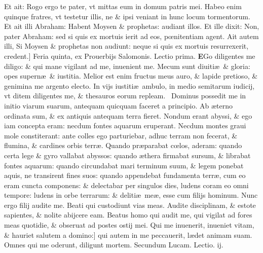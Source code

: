 \documentclass[a5paper,10pt]{book}
\def\leftmarginnote{%
	\lrmarginnote{\hskip -\marginparsep \hskip -6.5em}}
\def\rightmarginnote{%
	\lrmarginnote{\hskip\columnwidth \hskip -1em}}
\def\ae{æ}
\def\oe{œ}
\begin{document}
\begin{multicols*}{2}
Et ait: Rogo ergo te pater, vt mittas eum in domum patris mei.
Habeo enim quinque fratres, vt testetur illis, ne \& ipsi veniant in hunc locum tormentorum. Et ait illi Abraham: Habent Moysen \& prophetas: audiant illos.
Et ille dixit: Non, pater Abraham: sed si quis ex mortuis ierit ad eos, p\oe nitentiam agent.
Ait autem illi, Si Moysen \& prophetas non audiunt: neque si quis ex mortuis resurrexerit, credent.]
\newline {} \color{red} \hypertarget{THU-SECVNDA-POST-ADV}{Feria quinta,} ex Prouerbijs Salomonis. \hfill Lectio prima. \color{black}
\vspace{-2.25em}
\lettrine[lines=2]{\bfseries E}{}Go\rightmarginnote{ca. 8.} diligentes me diligo: \& qui mane vigilant ad me, inuenient me.
Mecum sunt diuiti\ae \ \& gloria: opes supern\ae \ \& iustitia. Melior est enim fructus meus auro, \& lapide pretioso, \& genimina me argento electo.
In vijs iustiti\ae \ ambulo, in medio semitarum iudicij, vt ditem diligentes me, \& thesauros eorum repleam. \textdagger \ 
Dominus\rightmarginnote{B} possedit me in initio viarum suarum, antequam quicquam faceret a principio.
Ab \ae terno ordinata sum, \& ex antiquis antequam terra fieret. Nondum erant abyssi, \& ego iam concepta eram: necdum fontes aquarum eruperant.
Necdum montes graui mole constiterant: ante colles ego parturiebar, adhuc terram non fecerat, \& flumina, \& cardines orbis terr\ae .
Quando\rightmarginnote{B} pr\ae parabat c\oe los, aderam: quando certa lege \& gyro vallabat abyssos: quando \ae thera firmabat sursum, \& librabat fontes aquarum: quando circundabat mari terminum suum, \& legem ponebat aquis, ne transirent fines suos: quando appendebat fundamenta terr\ae , cum eo eram
cuncta componens: \& delectabar per singulos dies, ludens coram eo omni tempore: ludens in orbe terrarum: \& deliti\ae \ me\ae , esse cum filijs hominum.
Nunc ergo filij audite me. Beati qui custodiunt vias meas. Audite disciplinam, \& estote sapientes, \& nolite abijcere eam.
Beatus homo qui audit me, qui vigilat ad fores meas quotidie, \& obseruat ad postes ostij mei.
Qui me inuenerit, inueniet vitam, \& hauriet salutem a domino:] qui\leftmarginnote{\begin{flushright}C\end{flushright}} autem in me peccauerit, l\ae det animam suam.
Omnes qui me oderunt, diligunt mortem.
\newline \color{red} Secundum Lucam. \hfill Lectio. ij. \color{black}
\vspace{-.25em}

\end{multicols*}
\end{document}
